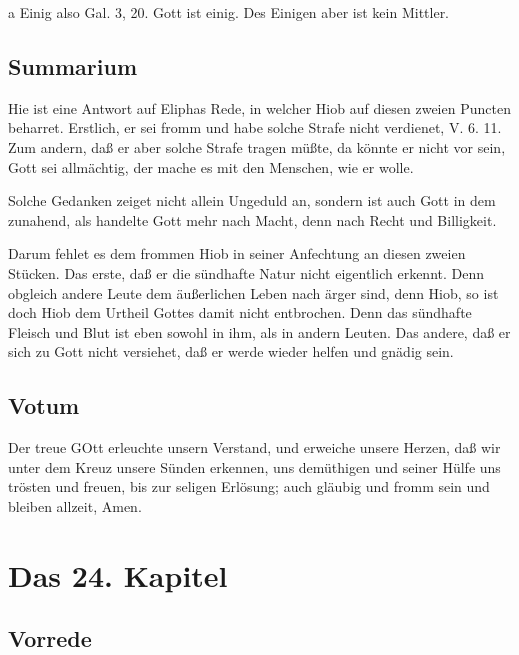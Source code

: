 a Einig also Gal. 3, 20. Gott ist einig. Des Einigen aber ist kein Mittler.

\section{Summarium}

Hie ist eine Antwort auf Eliphas Rede, in welcher Hiob auf diesen zweien Puncten beharret. Erstlich, er sei fromm und habe solche Strafe nicht verdienet, V. 6. 11. Zum andern, daß er aber solche Strafe tragen müßte, da könnte er nicht vor sein, Gott sei allmächtig, der mache es mit den Menschen, wie er wolle.

Solche Gedanken zeiget nicht allein Ungeduld an, sondern ist auch Gott in dem zunahend, als handelte Gott mehr nach Macht, denn nach Recht und Billigkeit.

Darum fehlet es dem frommen Hiob in seiner Anfechtung an diesen zweien Stücken. Das erste, daß er die sündhafte Natur nicht eigentlich erkennt. Denn obgleich andere Leute dem äußerlichen Leben nach ärger sind, denn Hiob, so ist doch Hiob dem Urtheil Gottes damit nicht entbrochen. Denn das sündhafte Fleisch und Blut ist eben sowohl in ihm, als in andern Leuten. Das andere, daß er sich zu Gott nicht versiehet, daß er werde wieder helfen und gnädig sein.

\section{Votum}

Der treue GOtt erleuchte unsern Verstand, und erweiche unsere Herzen, daß wir unter dem Kreuz unsere Sünden erkennen, uns demüthigen und seiner Hülfe uns trösten und freuen, bis zur seligen Erlösung; auch gläubig und fromm sein und bleiben allzeit, Amen.

\chapter{Das 24. Kapitel}

\section{Vorrede}

